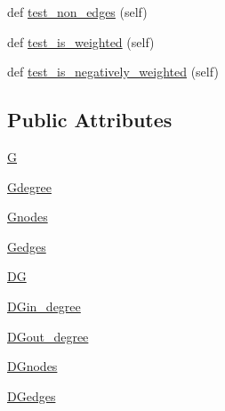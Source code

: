 \begin{DoxyCompactItemize}
\item 
def \hyperlink{classnetworkx_1_1classes_1_1tests_1_1test__function_1_1TestFunction_a8d79a4e0afc491b3174d0c2444205dac}{test\+\_\+non\+\_\+edges} (self)
\item 
def \hyperlink{classnetworkx_1_1classes_1_1tests_1_1test__function_1_1TestFunction_a702511df061f3b3fadf64e851e7d3587}{test\+\_\+is\+\_\+weighted} (self)
\item 
def \hyperlink{classnetworkx_1_1classes_1_1tests_1_1test__function_1_1TestFunction_a5a46f2b54ee0eb4485ec03d483c599fb}{test\+\_\+is\+\_\+negatively\+\_\+weighted} (self)
\end{DoxyCompactItemize}
\subsection*{Public Attributes}
\begin{DoxyCompactItemize}
\item 
\hyperlink{classnetworkx_1_1classes_1_1tests_1_1test__function_1_1TestFunction_a54241a79e86c2531924346480722a8ea}{G}
\item 
\hyperlink{classnetworkx_1_1classes_1_1tests_1_1test__function_1_1TestFunction_a942dabcb3866fd111c66a845ded5d536}{Gdegree}
\item 
\hyperlink{classnetworkx_1_1classes_1_1tests_1_1test__function_1_1TestFunction_aea44378516e877393b82d04a5b1e9796}{Gnodes}
\item 
\hyperlink{classnetworkx_1_1classes_1_1tests_1_1test__function_1_1TestFunction_a459d8d64e8bae2b20dcc9d4d15c65933}{Gedges}
\item 
\hyperlink{classnetworkx_1_1classes_1_1tests_1_1test__function_1_1TestFunction_a3f25615d144f8e274e13bdd14d1229b7}{DG}
\item 
\hyperlink{classnetworkx_1_1classes_1_1tests_1_1test__function_1_1TestFunction_ab714e615bdaf52d28fe10260de3c8df0}{D\+Gin\+\_\+degree}
\item 
\hyperlink{classnetworkx_1_1classes_1_1tests_1_1test__function_1_1TestFunction_a87303b61e696151a97852863a34ac8f0}{D\+Gout\+\_\+degree}
\item 
\hyperlink{classnetworkx_1_1classes_1_1tests_1_1test__function_1_1TestFunction_aa8000c64799eb1a8e6b9ff908fe50555}{D\+Gnodes}
\item 
\hyperlink{classnetworkx_1_1classes_1_1tests_1_1test__function_1_1TestFunction_a97205d851600032a6f5a1ef531c69d4b}{D\+Gedges}
\end{DoxyCompactItemize}


